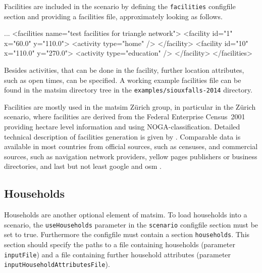 Facilities are included in the scenario by defining the \lstinline|facilities| \gls{configfile} section and providing a facilities file, approximately looking as follows.
%
\begin{xml}
...
<facilities name="test facilities for triangle network">
	<facility id="1" x="60.0" y="110.0">
		<activity type="home" />
	</facility>
	<facility id="10" x="110.0" y="270.0">
		<activity type="education" />
	</facility>
</facilities>
\end{xml}
%
Besides activities, that can be done in the facility, further location attributes, such as open times, can be specified. 
A working example facilities file can be found in the \gls{matsim} directory tree in the \lstinline{examples/siouxfalls-2014} directory.

Facilities are mostly used in the \gls{matsim} Zürich group, in particular in the Zürich scenario, where facilities are derived from the Federal Enterprise Census~2001 \citep[][]{SwissEnterpriseCensus_manual_2001} providing hectare level information and using NOGA-classification. Detailed technical description of facilities generation is given by \citet[][]{Meister_TechRep_IVT_2008, Meister_unpub_IVT_2007}. Comparable data is available in most countries from official sources, such as censuses, and commercial sources, such as navigation network providers, yellow pages publishers or business directories, and last but not least google and \gls{osm} \citep[][]{OpenStreetMap_Webpage_2015}.



\subsection{Households}
\label{sec:extending-households}
Households are another optional element of \gls{matsim}. To load households into a scenario, the \lstinline|useHouseholds| parameter in the \lstinline|scenario| \gls{configfile} section must be set to true. Furthermore the \gls{configfile} must contain a section \lstinline|households|. This section should specify the paths to a file containing households (parameter \lstinline|inputFile|) and a file containing further household attributes (parameter \lstinline|inputHouseholdAttributesFile|).

